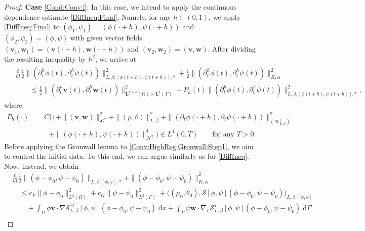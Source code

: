 \documentclass[10pt,reqno]{amsart}
\theoremstyle{remark}
\numberwithin{equation}{section}
\newcommand{\norm}[1]{\| #1 \|}
\newcommand{\bv}{\mathbf{v}}
\newcommand{\bw}{\mathbf{w}}
\newcommand{\intO}{\int_\Omega}
\newcommand{\intG}{\int_\Gamma}
\newcommand{\dx}{\;\mathrm{d}x}
\newcommand{\dG}{\;\mathrm d\Ga}
\newcommand{\ddt}{\frac{\mathrm d}{\mathrm dt}}
\newcommand{\delt}{\partial_{t}}
\newcommand{\delth}{\partial_{t}^{h}}
\newcommand{\Grad}{\nabla}
\newcommand{\Gradg}{\nabla_\Ga}
\newcommand{\Om}{\Omega}
\newcommand{\Ga}{\Gamma}
\begin{document}
\begin{proof}
    \textbf{Case }\ref{Cond:Conv:i}: In this case, we intend to apply the continuous dependence estimate \eqref{DiffIneq:Final}.
    Namely, for any $h\in(0,1)$, we apply \eqref{DiffIneq:Final} to $(\phi_1,\psi_1) = (\phi(\cdot + h),\psi(\cdot + h))$ and $(\phi_2,\psi_2) = (\phi,\psi)$ with given vector fields $(\bv_1,\bw_1) = (\bv(\cdot + h),\bw(\cdot + h))$ and $(\bv_2,\bw_2) = (\bv,\bw)$. After dividing the resulting inequality by $h^2$, we arrive at
    \begin{align}\label{Conv:HighReg:Gronwall:Step1}
        \begin{split}
        	&\ddt \frac12\norm{(\delth\phi(t),\delth\psi(t))}_{L,\beta,[\phi(t+h),\psi(t+h)],\ast}^2 + \frac12\norm{(\delth\phi(t),\delth\psi(t))}_{K,\alpha}^2 \\
            &\qquad \leq \frac12\norm{(\delth\mathbf{v}(t),\delth\mathbf{w}(t))}_{\mathbf{L}^{1+\omega}(\Om)\times\mathbf{L}^1(\Ga)}^2 + P_h(t)\norm{(\delth\phi(t),\delth\psi(t))}_{L,\beta,[\phi(t+h),\psi(t+h)],\ast}^2,
        \end{split}
    \end{align}
    where
    \begin{align*}
        P_h(\cdot) &= C\big(1 + \norm{(\mathbf{v},\mathbf{w})}_{\mathbfcal{L}^2}^2 + \norm{(\mu,\theta)}_{L,\beta}^2 + \norm{(\delt\phi(\cdot + h),\delt\psi(\cdot + h))}_{(\mathcal{H}^1_{L,\beta})^\prime}^2 \\
        &\qquad + \norm{(\phi(\cdot + h),\psi(\cdot + h))}_{\mathcal{H}^2}^4\big)\in L^1(0,T) \qquad\text{for any~} T > 0.
    \end{align*}
    Before applying the Gronwall lemma to \eqref{Conv:HighReg:Gronwall:Step1}, we aim to control the initial data. To this end, we can argue similarly as for \eqref{DiffIneq}. Now, instead, we obtain
    \begin{align}\label{DiffIneq:InitialData}
        &\ddt\frac12\norm{(\phi - \phi_0,\psi - \psi_0)}_{L,\beta,[\phi,\psi],\ast} + \norm{(\phi - \phi_0,\psi - \psi_0)}_{K,\alpha}^2 \nonumber \\
        &\quad\leq c_F\norm{\phi - \phi_0}_{L^2(\Om)}^2 + c_G\norm{\psi - \psi_0}_{L^2(\Ga)}^2 + \big((\mu_0,\theta_0),\mathcal{S}[\phi,\psi](\phi - \phi_0,\psi - \psi_0)\big)_{L,\beta,[\phi,\psi]} \nonumber \\
        &\qquad + \intO \phi\bv\cdot\Grad\mathcal{S}_{L,\beta}^\Om[\phi,\psi](\phi - \phi_0, \psi - \psi_0)\dx + \intG \psi\bw\cdot\Gradg\mathcal{S}_{L,\beta}^\Ga[\phi,\psi](\phi - \phi_0, \psi - \psi_0)\dG \\ 

\end{align}
\end{proof}
\end{document}
